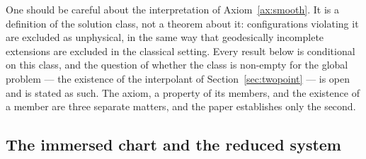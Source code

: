 \documentclass[11pt]{article}
\numberwithin{equation}{section}
\theoremstyle{plain}
\theoremstyle{definition}
\theoremstyle{remark}
\begin{document}
One should be careful about the interpretation of
Axiom~\ref{ax:smooth}. It is a definition of the solution class, not a
theorem about it: configurations violating it are excluded as
unphysical, in the same way that geodesically incomplete extensions
are excluded in the classical setting. Every result below is
conditional on this class, and the question of whether the class is
non-empty for the global problem --- the existence of the interpolant
of Section~\ref{sec:twopoint} --- is open and is stated as such. The
axiom, a property of its members, and the existence of a member are
three separate matters, and the paper establishes only the second.

\subsection{The immersed chart and the reduced system}
\end{document}
